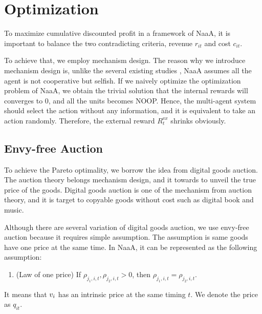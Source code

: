 \section{Optimization}
To maximize cumulative discounted profit in a framework of NaaA,
it is important to balance the two contradicting criteria, revenue $r_{it}$ and cost $c_{it}$.



To achieve that, we employ mechanism design.
The reason why we introduce mechanism design is, unlike the several existing studies \citep{sukhbaatar2016learning}, NaaA assumes all the agent is not cooperative but selfish.
If we naively optimize the optimization problem of NaaA, we obtain the trivial solution that the internal rewards will converges to 0, and all the units becomes NOOP.
Hence, the multi-agent system should select the action without any information, and it is equivalent to take an action randomly.
Therefore, the external reward $R_t^{\mathrm ex}$ shrinks obviously.


\subsection{Envy-free Auction}
To achieve the Pareto optimality, we borrow the idea from digital goods auction.
The auction theory belongs mechanism design, and it towards to unveil the true price of the goods.
Digital goods auction is one of the mechanism from auction theory,
and it is target to copyable goods without cost such as digital book and music.

Although there are several variation of digital goods auction,
we use envy-free auction \citep{guruswami2005profit} because it requires simple assumption.
The assumption is same goods have one price at the same time.
In NaaA, it can be represented as the following assumption:
\begin{enumerate}
\renewcommand{\labelenumi}{N\arabic{enumi}:}
\setcounter{enumi}{4}
\item (Law of one price)
	If $\rho_{j_1,i,t}, \rho_{j_2,i,t} > 0$, then $\rho_{j_1,i,t} = \rho_{j_2,i,t}$.
\end{enumerate}
It means that $v_{i}$ has an intrinsic price at the same timing $t$.
We denote the price as $q_{it}$.

